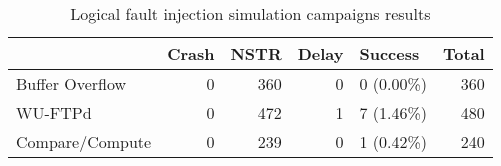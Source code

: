 \begin{table}[H]
\centering
\caption{Logical fault injection simulation campaigns results}
\label{table:end_sim_by_status_wop_multi_bitflip_reg}
\begin{tabular}{lrrrlr}
\toprule
 & Crash & NSTR & Delay & Success & Total \\
\midrule
Buffer Overflow & 0 & 360 & 0 & 0 (0.00\%) & 360 \\
WU-FTPd & 0 & 472 & 1 & 7 (1.46\%) & 480 \\
Compare/Compute & 0 & 239 & 0 & 1 (0.42\%) & 240 \\
\bottomrule
\end{tabular}
\end{table}
